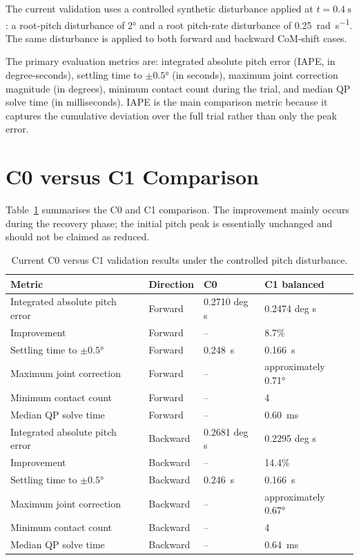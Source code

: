 \documentclass[12pt,a4paper]{report}
\begin{document}
The current validation uses a controlled synthetic disturbance applied at $t=\SI{0.4}{\second}$: a root-pitch disturbance of \ang{2} and a root pitch-rate disturbance of \SI{0.25}{\radian\per\second}. The same disturbance is applied to both forward and backward CoM-shift cases.
 
The primary evaluation metrics are: integrated absolute pitch error (IAPE, in degree-seconds), settling time to $\pm\ang{0.5}$ (in seconds), maximum joint correction magnitude (in degrees), minimum contact count during the trial, and median QP solve time (in milliseconds). IAPE is the main comparison metric because it captures the cumulative deviation over the full trial rather than only the peak error.
 
\section{C0 versus C1 Comparison}\label{sec:c0_c1_comparison}
 
Table~\ref{tab:c0_c1_results} summarises the C0 and C1 comparison. The improvement mainly occurs during the recovery phase; the initial pitch peak is essentially unchanged and should not be claimed as reduced.
 
\begin{table}[htbp]
\centering
\caption{Current C0 versus C1 validation results under the controlled pitch disturbance.}
\label{tab:c0_c1_results}
\begin{tabular}{@{}llll@{}}
\toprule
Metric & Direction & C0 & C1 balanced \\
\midrule
Integrated absolute pitch error & Forward & 0.2710 deg s & 0.2474 deg s \\
Improvement & Forward & -- & 8.7\% \\
Settling time to $\pm\ang{0.5}$ & Forward & \SI{0.248}{\second} & \SI{0.166}{\second} \\
Maximum joint correction & Forward & -- & approximately \ang{0.71} \\
Minimum contact count & Forward & -- & 4 \\
Median QP solve time & Forward & -- & \SI{0.60}{\milli\second} \\
\midrule
Integrated absolute pitch error & Backward & 0.2681 deg s & 0.2295 deg s \\
Improvement & Backward & -- & 14.4\% \\
Settling time to $\pm\ang{0.5}$ & Backward & \SI{0.246}{\second} & \SI{0.166}{\second} \\
Maximum joint correction & Backward & -- & approximately \ang{0.67} \\
Minimum contact count & Backward & -- & 4 \\
Median QP solve time & Backward & -- & \SI{0.64}{\milli\second} \\
\bottomrule
\end{tabular}
\end{table}
 
\end{document}
